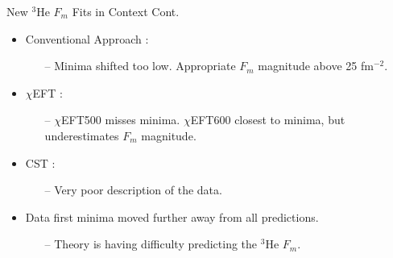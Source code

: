\documentclass[10pt]{beamer}
\begin{document}
\begin{frame}[fragile]{New $^3$He $F_{m}$ Fits in Context Cont.}
	\begin{itemize}
		\pause
		\item \alert{Conventional Approach} \cite{Article:Marcucci}:
			\begin{itemize}
				\item[--] \alert{Minima shifted too low}. \alert{Appropriate $F_m$ magnitude above 25 fm$^{-2}$}.
			\end{itemize}
		\pause
		\item \alert{$\chi$EFT} \cite{Article:Marcucci}:
			\begin{itemize}
				\item[--] \alert{$\chi$EFT500 misses minima}. \alert{$\chi$EFT600 closest to minima}, but \alert{underestimates $F_m$ magnitude}.
			\end{itemize}
		\pause
		\item \alert{CST} \cite{Article:Marcucci}:
			\begin{itemize}
				\item[--] \alert{Very poor description of the data}.
			\end{itemize}
		\pause
		\item \alert{Data first minima moved further away from all predictions}.
			\begin{itemize}
				\item[--] \alert{Theory is having difficulty predicting the $^3$He $F_m$}.
			\end{itemize}
	\end{itemize}

\end{frame}
\end{document}
